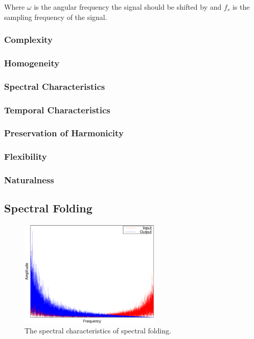 		Where $\omega$ is the angular frequency the signal should be shifted by and $f_{s}$ is the sampling
		frequency of the signal.

		\subsubsection*{Complexity}
		\subsubsection*{Homogeneity}
		\subsubsection*{Spectral Characteristics}
		\subsubsection*{Temporal Characteristics}
		\subsubsection*{Preservation of Harmonicity}
		\subsubsection*{Flexibility}
		\subsubsection*{Naturalness}

	\subsection{Spectral Folding}
	\label{sec:Excitation-SpectralFolding}
	
		\begin{figure}[h!]
			\centering
			\includegraphics[width=0.6\textwidth]{chapter3/Images/SpectralFoldingSpectrum.eps}
			\caption{The spectral characteristics of spectral folding.}
			\label{fig:SpectralFolding}
		\end{figure}

